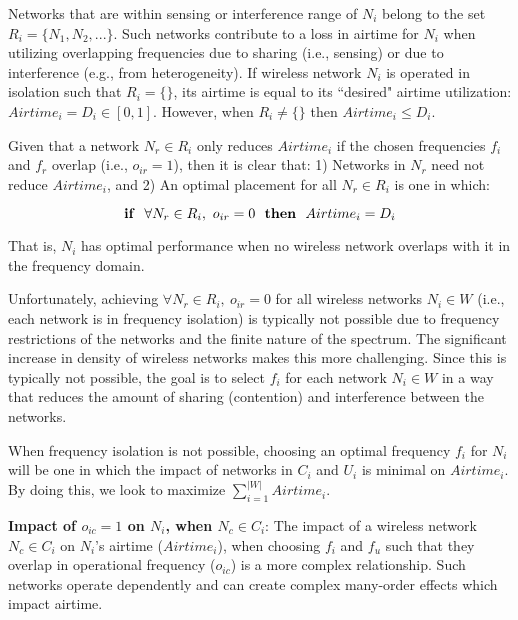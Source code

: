 Networks that are within sensing or interference range of $N_i$ belong to the set $R_i = \{N_1, N_2, ... \}$.  Such networks contribute to a loss in airtime for $N_i$ when utilizing overlapping frequencies due to sharing (i.e., sensing) or due to interference (e.g., from heterogeneity).  If wireless network $N_i$ is operated in isolation such that $R_i = \{ \}$, its airtime is equal to its ``desired" airtime utilization: $Airtime_i = D_i \in [0,1]$. However, when $R_i \neq \{ \}$ then $Airtime_i \leq D_i$. 

Given that a network $N_r \in R_i$ only reduces $Airtime_i$ if the chosen frequencies $f_i$ and $f_r$ overlap (i.e., $o_{ir} = 1$), then it is clear that: 1) Networks in $N_r$ need not reduce $Airtime_i$, and 2) An optimal placement for all $N_r \in R_i$ is one in which:

\vspace{-0.2in}
\begin{equation}
 \text{\textbf{if}}~~\forall N_r \in R_i, ~o_{ir}=0 ~~\text{\textbf{then}}~~ Airtime_i = D_i
\end{equation}

\noindent That is, $N_i$ has optimal performance when no wireless network overlaps with it in the frequency domain. 

Unfortunately, achieving $\forall N_r \in R_i, ~o_{ir}=0$ for all wireless networks $N_i \in W$ (i.e., each network is in frequency isolation) is typically not possible due to frequency restrictions of the networks and the finite nature of the spectrum.   The significant increase in density of wireless networks makes this more challenging.  Since this is typically not possible, the goal is to select $f_i$ for each network $N_i \in W$ in a way that reduces the amount of sharing (contention) and interference between the networks. 

When frequency isolation is not possible, choosing an optimal frequency $f_i$ for $N_i$ will be one in which the impact of networks in $C_i$ and $U_i$ is minimal on $Airtime_i$.  By doing this, we look to maximize $\sum_{i=1}^{|W|} Airtime_i$.  

\textbf{Impact of $o_{ic}=1$ on $N_i$, when $N_c \in C_i$}:  The impact of a wireless network $N_c \in C_i$ on $N_i$'s airtime ($Airtime_i$), when choosing $f_i$ and $f_u$ such that they overlap in operational frequency ($o_{ic}$) is a more complex relationship.  Such networks operate dependently and can create complex many-order effects which impact airtime.

